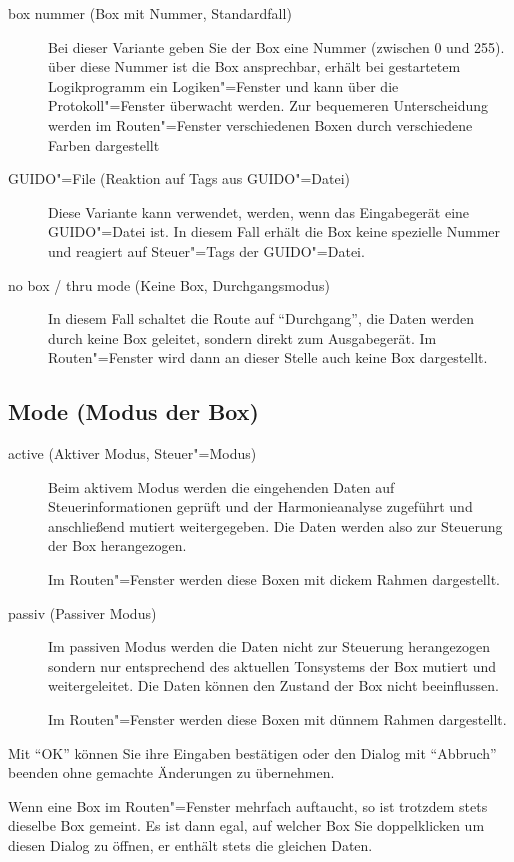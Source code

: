 \begin{description}
\item[box nummer (Box mit Nummer, Standardfall)] Bei dieser Variante
  geben Sie der Box eine Nummer (zwischen 0 und 255). über diese
  Nummer ist die Box ansprechbar, erhält bei gestartetem Logikprogramm
  ein Logiken"=Fenster und kann über die Protokoll"=Fenster überwacht
  werden. Zur bequemeren Unterscheidung werden im Routen"=Fenster
  verschiedenen Boxen durch verschiedene Farben dargestellt
\item[GUIDO"=File (Reaktion auf Tags aus GUIDO"=Datei)] Diese Variante
  kann verwendet, werden, wenn das Eingabegerät eine GUIDO"=Datei ist.
  In diesem Fall erhält die Box keine spezielle Nummer und reagiert
  auf Steuer"=Tags der GUIDO"=Datei.
\item[no box / thru mode (Keine Box, Durchgangsmodus)] In diesem Fall
  schaltet die Route auf ``Durchgang'', die Daten werden durch keine
  Box geleitet, sondern direkt zum Ausgabegerät.  Im Routen"=Fenster
  wird dann an dieser Stelle auch keine Box dargestellt.
\end{description}


\subsection{Mode (Modus der Box)}
\begin{description}
\item[active (Aktiver Modus, Steuer"=Modus)] Beim aktivem Modus werden
  die eingehenden Daten auf Steuerinformationen geprüft und der
  Harmonieanalyse zugeführt und anschließend mutiert weitergegeben.
  Die Daten werden also zur Steuerung der Box herangezogen.

  Im Routen"=Fenster werden diese Boxen mit dickem Rahmen dargestellt.
\item[passiv (Passiver Modus)] Im passiven Modus werden die Daten
  nicht zur Steuerung herangezogen sondern nur entsprechend des
  aktuellen Tonsystems der Box mutiert und weitergeleitet. Die Daten
  können den Zustand der Box nicht beeinflussen.


  Im Routen"=Fenster werden diese Boxen mit dünnem Rahmen dargestellt.
\end{description}


Mit "`OK"' können Sie ihre Eingaben bestätigen oder den Dialog 
mit "`Abbruch"' beenden ohne gemachte Änderungen zu übernehmen.

Wenn eine Box im Routen"=Fenster mehrfach auftaucht, so ist trotzdem
stets dieselbe Box gemeint. Es ist dann egal, auf welcher Box Sie
doppelklicken um diesen Dialog zu öffnen, er enthält stets die
gleichen Daten.

